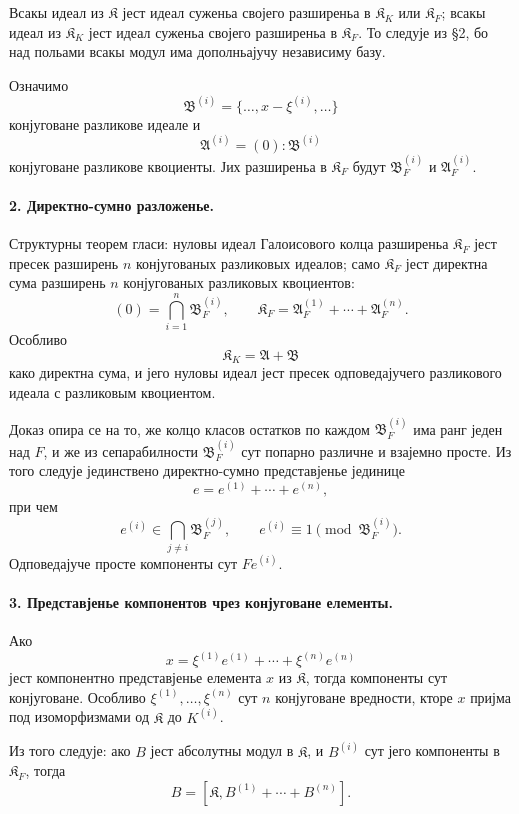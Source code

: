﻿\documentclass[11pt]{article}
\begin{document}
Всакы идеал из \(\mathfrak K\) јест идеал суженьа својего разширеньа в \(\mathfrak K_K\) или \(\mathfrak K_F\); всакы идеал из \(\mathfrak K_K\) јест идеал суженьа својего разширеньа в \(\mathfrak K_F\). То следује из §2, бо над польами всакы модул има дополньајучу независиму базу.

Означимо
\[
        \mathfrak B^{(i)}=\{\ldots,x-\xi^{(i)},\ldots\}
\]
конјуговане разликове идеале и
\[
        \mathfrak A^{(i)}=(0):\mathfrak B^{(i)}
\]
конјуговане разликове квоциенты. Јих разширеньа в \(\mathfrak K_F\) будут \(\mathfrak B_F^{(i)}\) и \(\mathfrak A_F^{(i)}\).

\paragraph{2. Директно-сумно разложенье.}
Структурны теорем гласи: нуловы идеал Галоисового колца разширеньа \(\mathfrak K_F\) јест пресек разширень \(n\) конјугованых разликовых идеалов; само \(\mathfrak K_F\) јест директна сума разширень \(n\) конјугованых разликовых квоциентов:
\[
        (0)=\bigcap_{i=1}^n \mathfrak B_F^{(i)},
        \qquad
        \mathfrak K_F=\mathfrak A_F^{(1)}+\cdots+\mathfrak A_F^{(n)}.
\]
Особливо
\[
        \mathfrak K_K=\mathfrak A+\mathfrak B
\]
како директна сума, и јего нуловы идеал јест пресек одповедајучего разликового идеала с разликовым квоциентом.

Доказ опира се на то, же колцо класов остатков по каждом \(\mathfrak B_F^{(i)}\) има ранг једен над \(F\), и же из сепарабилности \(\mathfrak B_F^{(i)}\) сут попарно различне и взајемно просте. Из того следује јединствено директно-сумно представјенье јединице
\[
        e=e^{(1)}+\cdots+e^{(n)},
\]
при чем
\[
        e^{(i)}\in \bigcap_{j\ne i}\mathfrak B_F^{(j)},
        \qquad
        e^{(i)}\equiv 1\pmod{\mathfrak B_F^{(i)}}.
\]
Одповедајуче просте компоненты сут \(Fe^{(i)}\).

\paragraph{3. Представјенье компонентов чрез конјуговане елементы.}
Ако
\[
        x=\xi^{(1)}e^{(1)}+\cdots+\xi^{(n)}e^{(n)}
\]
јест компонентно представјенье елемента \(x\) из \(\mathfrak K\), тогда компоненты сут конјуговане. Особливо \(\xi^{(1)},\ldots,\xi^{(n)}\) сут \(n\) конјуговане вредности, кторе \(x\) пријма под изоморфизмами од \(\mathfrak K\) до \(K^{(i)}\).

Из того следује: ако \(B\) јест абсолутны модул в \(\mathfrak K\), и \(B^{(i)}\) сут јего компоненты в \(\mathfrak K_F\), тогда
\[
        B=[\mathfrak K,B^{(1)}+\cdots+B^{(n)}].
\]
\end{document}
